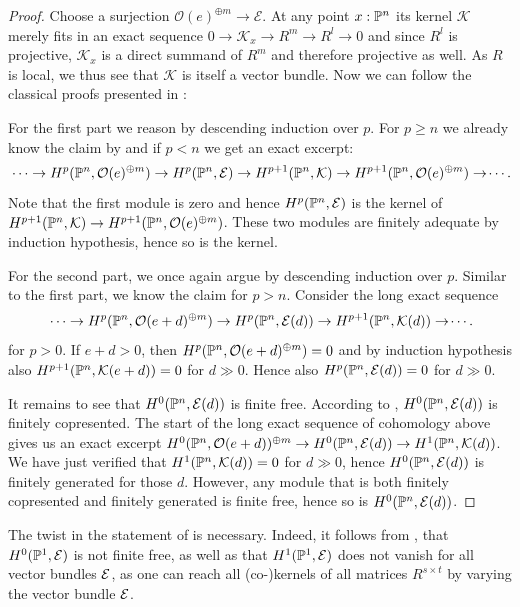 \begin{proof}
  Choose a surjection $\mathcal O(e)^{\oplus m} \to \mathcal E$.
  At any point $x:\mathbb{P}^n$ its kernel $\mathcal K$ merely fits in an exact sequence $0 \to \mathcal K_x \to R^m \to R^l \to 0$ and since $R^l$ is projective, $\mathcal K_x$ is a direct summand of $R^m$ and therefore projective as well.
  As $R$ is local, we thus see that $\mathcal K$ is itself a vector bundle.
  Now we can follow the classical proofs presented in \cite{Hartshorne}:

  For the first part we reason by descending induction over $p$.
  For $p \geq n$ we already know the claim by  and if $p < n$ we get an exact excerpt:
  \[
    \dots \to H^p(\bP^n,\mathcal O(e)^{\oplus m}) \to H^p(\bP^n, \mathcal E) \to H^{p+1}(\bP^n, \mathcal K) \to H^{p+1}(\bP^n,\mathcal O(e)^{\oplus m}) \to\dotsi\rlap{.}
  \]
  Note that the first module is zero and hence $H^p(\mathbb{P}^n,\mathcal E)$ is the kernel of $H^{p+1}(\mathbb{P}^n, \mathcal K) \to H^{p+1}(\mathbb{P}^n,\mathcal O(e)^{\oplus m})$.
  These two modules are finitely adequate by induction hypothesis, hence so is the kernel.

  For the second part, we once again argue by descending induction over $p$. Similar to the first part, we know the claim for $p>n$.
  Consider the long exact sequence
  \[
    \dots \to H^p(\bP^n,\mathcal O(e+d)^{\oplus m}) \to H^p(\bP^n, \mathcal E(d)) \to H^{p+1}(\bP^n, \mathcal K(d)) \to \dotsi\rlap{.}
  \]
  for $p > 0$.
  If $e+d>0$, then $H^p(\mathbb{P}^n,\mathcal O(e+d)^{\oplus m}) = 0$ and by induction hypothesis also $H^{p+1}(\mathbb{P}^n,\mathcal K(e+d)) = 0$ for $d \gg 0$.
  Hence also $H^p(\mathbb{P}^n, \mathcal E(d)) = 0$ for $d \gg 0$.

  It remains to see that $H^0(\mathbb{P}^n, \mathcal{E}(d))$ is finite free.
  According to , $H^0(\mathbb{P}^n,\mathcal E(d))$ is finitely copresented.
  The start of the long exact sequence of cohomology above gives us an exact excerpt $H^0(\mathbb{P}^n, \mathcal O(e+d))^{\oplus m} \to H^0(\mathbb{P}^n, \mathcal E(d)) \to H^1(\mathbb{P}^n, \mathcal K(d))$.
  We have just verified that $H^1(\mathbb{P}^n, \mathcal{K}(d)) = 0$ for $d \gg 0$, hence $H^0(\mathbb{P}^n, \mathcal{E}(d))$ is finitely generated for those $d$.
  However, any module that is both finitely copresented and finitely generated is finite free, hence so is $H^0(\mathbb{P}^n, \mathcal E(d))$.
\end{proof}

\begin{remark}
  The twist in the statement of  is necessary.
  Indeed, it follows from , that $H^0(\mathbb{P}^1, \mathcal{E})$ is not finite free, as well as that $H^1(\mathbb{P}^1, \mathcal{E})$ does not vanish for all vector bundles $\mathcal{E}$, as one can reach all (co-)kernels of all matrices $R^{s \times t}$ by varying the vector bundle $\mathcal{E}$.
\end{remark}

